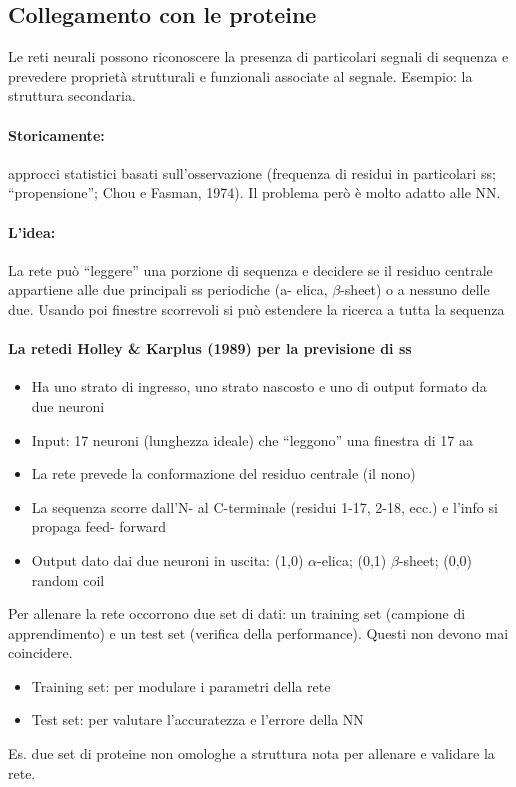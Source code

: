 \documentclass{article}
\begin{document}
\subsection{Collegamento con le proteine}
Le reti neurali possono riconoscere la presenza di particolari
segnali di sequenza e prevedere proprietà strutturali e funzionali
associate al segnale. Esempio: la struttura secondaria.
\paragraph{Storicamente:} approcci statistici basati sull'osservazione
(frequenza di residui in particolari ss; “propensione”;
Chou e Fasman, 1974). Il problema però è molto adatto alle NN.
\paragraph{L'idea:} La rete può “leggere” una porzione di sequenza e decidere se il
residuo centrale appartiene alle due principali ss periodiche (a-
elica, $\beta$-sheet) o a nessuno delle due.
Usando poi finestre scorrevoli si può estendere la ricerca a tutta la sequenza
\paragraph{La retedi Holley \& Karplus (1989) per la previsione di ss}
\begin{itemize}
    \item Ha uno strato di ingresso, uno strato nascosto e uno di output formato da due neuroni
    \item Input: 17 neuroni (lunghezza ideale) che “leggono” una finestra di 17 aa
    \item La rete prevede la conformazione del residuo centrale (il nono)
    \item La sequenza scorre dall'N- al C-terminale (residui 1-17, 2-18, ecc.) e l'info si propaga feed-
    forward
    \item Output dato dai due neuroni in uscita: (1,0) $\alpha$-elica; (0,1) $\beta$-sheet; (0,0) random coil
\end{itemize}
Per allenare la rete occorrono due set di dati: un training set
(campione di apprendimento) e un test set (verifica della
performance). Questi non devono mai coincidere.
\begin{itemize}
    \item Training set: per modulare i parametri della rete
    \item Test set: per valutare l'accuratezza e l'errore della NN
\end{itemize}
Es. due set di proteine non omologhe a struttura nota per allenare
e validare la rete.
\end{document}
